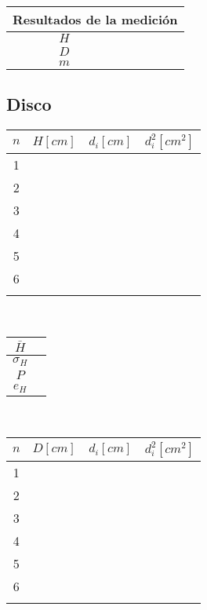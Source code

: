 \documentclass[letter,11pt]{article}
\begin{document}
\vspace{1.4cm}
\begin{tabular}{|c|p{2.0cm}|}
\hline
\multicolumn{2}{|c|}{Resultados de la medición} \\ \hline
$H$ & \\ \hline
$D$ & \\ \hline
$m$ & \\ \hline
\end{tabular}

\subsection{Disco}
\begin{tabular}{|c|>{\centering}m{2.0cm}<{\centering}
                  |>{\centering}m{2.0cm}<{\centering}
                  |>{\centering}m{2.0cm}<{\centering}|}
\hline
\textbf{$n$} & \textbf{$H[cm]$}
             & \textbf{$d_i[cm]$}
             & \textbf{$d_i^2[cm^2]$} \tabularnewline \hline
1 & & & \\ \hline
2 & & & \\ \hline
3 & & & \\ \hline
4 & & & \\ \hline
5 & & & \\ \hline
6 & & & \\ \hline
 & & & \\ \hline
\end{tabular}\\

\vspace{0.5cm}
\begin{tabular}{|c|p{2.0cm}|}
\hline
$\bar{H}$ & \\ \hline
$\sigma_H$ & \\ \hline
$P$ & \\ \hline
$e_H$ & \\ \hline
\end{tabular}\\

\begin{tabular}{|c|>{\centering}m{2.0cm}<{\centering}
                  |>{\centering}m{2.0cm}<{\centering}
                  |>{\centering}m{2.0cm}<{\centering}|}
\hline
\textbf{$n$} & \textbf{$D[cm]$}
             & \textbf{$d_i[cm]$}
             & \textbf{$d_i^2[cm^2]$} \tabularnewline \hline
1 & & & \\ \hline
2 & & & \\ \hline
3 & & & \\ \hline
4 & & & \\ \hline
5 & & & \\ \hline
6 & & & \\ \hline
 & & & \\ \hline
\end{tabular}\\
\end{document}
